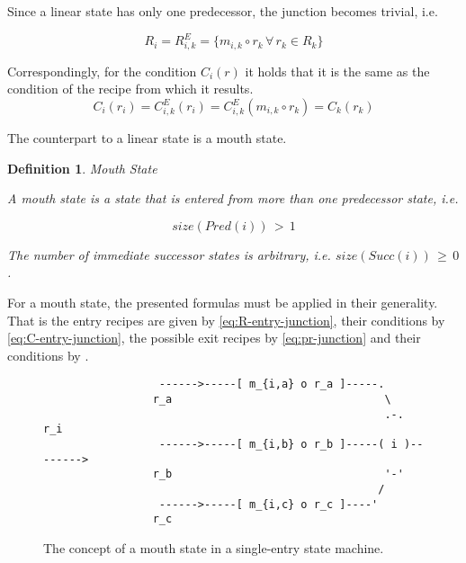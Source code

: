 \documentclass[12pt,a4paper]{scrartcl}
\newtheorem{definition}{Definition}
\begin{document}
Since a linear state has only one predecessor, the junction becomes trivial, i.e.

\begin{equation} \label{eq:composition-complete-recipe}
    R_i      = R^E_{i,k}      = \{ m_{i,k}\circ r_k \,\forall\, r_k\in R_k \}
\end{equation}

Correspondingly, for the condition $C_i(r)$ it holds that it is the same as the
condition of the recipe from which it results.
\begin{equation} \label{eq:composition-complete-condition}
    C_i(r_i) = C^E_{i,k}(r_i) = C^E_{i,k}(m_{i,k}\circ r_k) = C_k(r_k)
\end{equation}

The counterpart to a linear state is a mouth state.

\begin{definition} Mouth State

    A mouth state is a state that is entered from more than one predecessor
    state, i.e.

    \begin{equation}
                               size(Pred(i))\,>\,1
    \end{equation}

    The number of immediate successor states is arbitrary, i.e.
    $size(Succ(i))\,\ge\,0$.

\end{definition}

For a mouth state, the presented formulas must be applied in their generality.
That is the entry recipes are given by \ref{eq:R-entry-junction},  their 
conditions by \ref{eq:C-entry-junction}, the possible exit recipes by 
\ref{eq:pr-junction} and their conditions by \label{eq:c-junction}.

\begin{figure}[htbp] \leavevmode \label{fig:mouth-state}
\begin{verbatim}
                  ------>-----[ m_{i,a} o r_a ]-----.
                 r_a                                 \
                                                     .-.    r_i
                  ------>-----[ m_{i,b} o r_b ]-----( i )--------> 
                 r_b                                 '-'
                                                    /
                  ------>-----[ m_{i,c} o r_c ]----'
                 r_c 

\end{verbatim}
\caption{The concept of a mouth state in a single-entry state machine.}
\end{figure}
\end{document}

